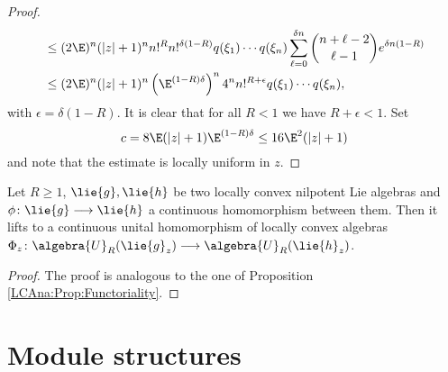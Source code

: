 \begin{proof}
\begin{align*}
        & \leq
        (2 \E)^n (|z| + 1)^n
        n!^R n!^{\delta (1 - R)}
        q(\xi_1) \cdots q(\xi_n)
        \sum\limits_{\ell = 0}^{\delta n}
        \binom{n + \ell - 2}{\ell - 1}
        e^{\delta n (1 - R)}
        \\
        & \leq
        (2 \E)^n (|z| + 1)^n
        \left(\E^{(1-R) \delta}\right)^n
        4^n n!^{R + \epsilon}
        q(\xi_1) \cdots q(\xi_n),
    \end{align*}
    with $\epsilon = \delta (1-R)$. It is clear that for all $R < 1$ we have
    $R + \epsilon < 1$. Set 
    \begin{equation*}
    	c 
    	= 
    	8 \E (|z|+1) \E^{(1-R)\delta}
    	\leq
    	16 \E^2 (|z|+1)
	\end{equation*}
	and note that the estimate is locally uniform in $z$.
\end{proof}
\begin{proposition}
	\label{Nilpot:Prop:Functoriality}
	Let $R \geq 1$, $\lie{g}, \lie{h}$ be two locally convex nilpotent Lie 
	algebras and $\phi \colon \lie{g} \longrightarrow \lie{h}$ a continuous 
	homomorphism between them. Then it lifts to a continuous unital 
	homomorphism of locally convex algebras $\Phi_z \colon 
	\algebra{U}_R(\lie{g}_z) \longrightarrow \algebra{U}_R(\lie{h}_z)$.
\end{proposition}
\begin{proof}
	The proof is analogous to the one of Proposition 
	\ref{LCAna:Prop:Functoriality}.
\end{proof}



\section{Module structures}
\label{sec:chap6_Modules}

